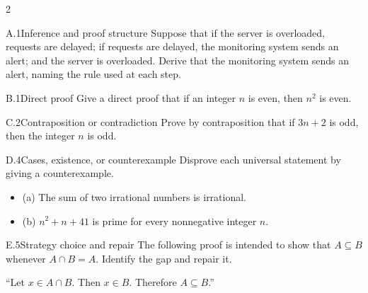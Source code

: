 \documentclass[9pt]{extarticle}
\begin{document}
\begin{multicols}{2}
\begin{CoreProblem}{A.1}{Inference and proof structure}
Suppose that if the server is overloaded, requests are delayed; if requests are
delayed, the monitoring system sends an alert; and the server is overloaded.
Derive that the monitoring system sends an alert, naming the rule used at each
step.
\end{CoreProblem}
\begin{CoreProblem}{B.1}{Direct proof}
Give a direct proof that if an integer $n$ is even, then $n^2$ is even.
\end{CoreProblem}
\begin{CoreProblem}{C.2}{Contraposition or contradiction}
Prove by contraposition that if $3n+2$ is odd, then the integer $n$ is odd.
\end{CoreProblem}
\columnbreak
\begin{CoreProblem}{D.4}{Cases, existence, or counterexample}
Disprove each universal statement by giving a counterexample.
\begin{itemize}
  \item (a) The sum of two irrational numbers is irrational.
  \item (b) $n^2+n+41$ is prime for every nonnegative integer $n$.
\end{itemize}
\end{CoreProblem}
\begin{CoreProblem}{E.5}{Strategy choice and repair}
The following proof is intended to show that $A\subseteq B$ whenever
$A\cap B=A$. Identify the gap and repair it.

``Let $x\in A\cap B$. Then $x\in B$. Therefore $A\subseteq B$.''
\end{CoreProblem}
\end{multicols}
\CoreWorkArea
\FormBreak
{}
\end{document}
